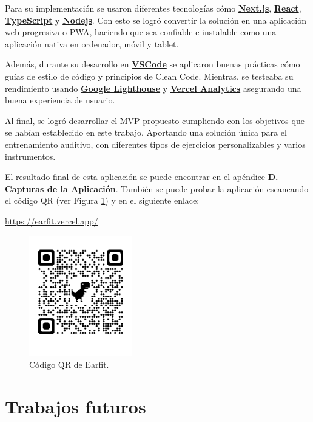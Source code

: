 \documentclass[12pt,twoside,titlepage]{report}
\begin{document}
Para su implementación se usaron diferentes tecnologías cómo \hyperref[sec:Next]{\textbf{Next.js}}, \hyperref[sec:React]{\textbf{React}}, \hyperref[sec:TypeScript]{\textbf{TypeScript}} y \hyperref[sec:Node]{\textbf{Nodejs}}. Con esto se logró convertir la solución en una aplicación web progresiva o PWA, haciendo que sea confiable e instalable como una aplicación nativa en ordenador, móvil y tablet. 

Además, durante su desarrollo en \hyperref[sec:VSCode]{\textbf{VSCode}} se aplicaron buenas prácticas cómo guías de estilo de código y principios de Clean Code. Mientras, se testeaba su rendimiento usando \hyperref[sec:lighthouse]{\textbf{Google Lighthouse}} y \hyperref[sec:analytics]{\textbf{Vercel Analytics}} asegurando una buena experiencia de usuario.

Al final, se logró desarrollar el MVP propuesto cumpliendo con los objetivos que se habían establecido en este trabajo. Aportando una solución única para el entrenamiento auditivo, con diferentes tipos de ejercicios personalizables y varios instrumentos. 

El resultado final de esta aplicación se puede encontrar en el apéndice \hyperref[sec:Capturas]{\textbf{D. Capturas de la Aplicación}}. También se puede probar la aplicación escaneando el código QR (ver Figura \ref{fig:EarfitQR}) y en el siguiente enlace: 

\url{https://earfit.vercel.app/}

\begin{figure}[H]
    \centering
    \includegraphics[width=0.4\textwidth]{Conclusiones/EarfitQR}
    \caption{Código QR de Earfit.}
    \label{fig:EarfitQR}
\end{figure}

\section{Trabajos futuros}
\end{document}
